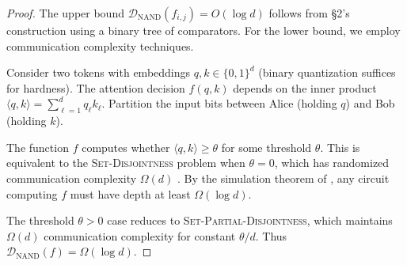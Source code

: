 \begin{proof}






The upper bound $\mathcal{D}_{\text{NAND}}(f_{i,j}) = O(\log d)$ follows from §2's construction using a binary tree of comparators. For the lower bound, we employ communication complexity techniques.













Consider two tokens with embeddings $q, k \in \{0,1\}^d$ (binary quantization suffices for hardness). The attention decision $f(q,k)$ depends on the inner product $\langle q, k \rangle = \sum_{\ell=1}^d q_\ell k_\ell$. Partition the input bits between Alice (holding $q$) and Bob (holding $k$). 













The function $f$ computes whether $\langle q, k \rangle \geq \theta$ for some threshold $\theta$. This is equivalent to the \textsc{Set-Disjointness} problem when $\theta = 0$, which has randomized communication complexity $\Omega(d)$ \cite{kalyanasundaram1992probabilistic}. By the simulation theorem of \cite{karchmer1990monotone}, any circuit computing $f$ must have depth at least $\Omega(\log d)$.













The threshold $\theta > 0$ case reduces to \textsc{Set-Partial-Disjointness}, which maintains $\Omega(d)$ communication complexity for constant $\theta/d$. Thus $\mathcal{D}_{\text{NAND}}(f) = \Omega(\log d)$.






\end{proof}













